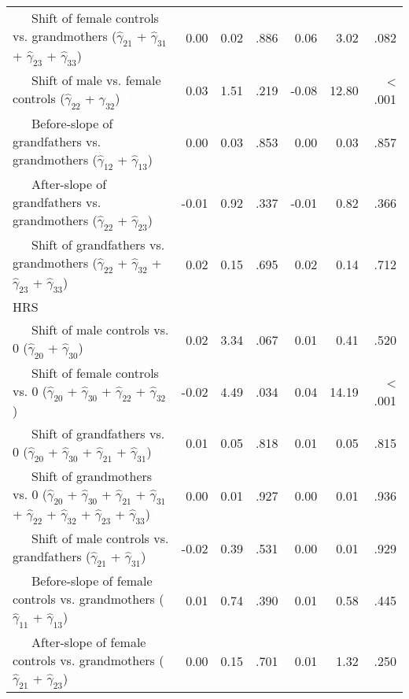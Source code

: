 \documentclass[
  english,
  man, noextraspace]{apa7}
\newenvironment{lltable}{\begin{landscape}\begin{center}\begin{ThreePartTable}}{\end{ThreePartTable}\end{center}\end{landscape}}
\begin{document}
\begin{appendix}
\begin{lltable}
{\begin{longtable}{lrrrrrr}
\ \ \ Shift of female controls vs. grandmothers 
($\hat{\gamma}_{21}$ + $\hat{\gamma}_{31}$ + 
$\hat{\gamma}_{23}$ + $\hat{\gamma}_{33}$) \textcolor{white}{L} & 0.00 & 0.02 & .886 & 0.06 & 3.02 & .082\\
\ \ \ Shift of male vs. female controls 
($\hat{\gamma}_{22}$ + $\hat{\gamma}_{32}$) \textcolor{white}{L} & 0.03 & 1.51 & .219 & -0.08 & 12.80 & < .001\\
\ \ \ Before-slope of grandfathers vs. grandmothers 
($\hat{\gamma}_{12}$ + $\hat{\gamma}_{13}$) \textcolor{white}{L} & 0.00 & 0.03 & .853 & 0.00 & 0.03 & .857\\
\ \ \ After-slope of grandfathers vs. grandmothers 
($\hat{\gamma}_{22}$ + $\hat{\gamma}_{23}$) \textcolor{white}{L} & -0.01 & 0.92 & .337 & -0.01 & 0.82 & .366\\
\ \ \ Shift of grandfathers vs. grandmothers 
($\hat{\gamma}_{22}$ + $\hat{\gamma}_{32}$ + 
$\hat{\gamma}_{23}$ + $\hat{\gamma}_{33}$) \textcolor{white}{L} & 0.02 & 0.15 & .695 & 0.02 & 0.14 & .712\\
HRS &  &  &  &  &  & \\
\ \ \ Shift of male controls vs. 0 ($\hat{\gamma}_{20}$ + 
$\hat{\gamma}_{30}$) \textcolor{white}{H} & 0.02 & 3.34 & .067 & 0.01 & 0.41 & .520\\
\ \ \ Shift of female controls vs. 0 ($\hat{\gamma}_{20}$ + 
$\hat{\gamma}_{30}$ + $\hat{\gamma}_{22}$ + 
$\hat{\gamma}_{32}$) \textcolor{white}{H} & -0.02 & 4.49 & .034 & 0.04 & 14.19 & < .001\\
\ \ \ Shift of grandfathers vs. 0 ($\hat{\gamma}_{20}$ + 
$\hat{\gamma}_{30}$ + $\hat{\gamma}_{21}$ + 
$\hat{\gamma}_{31}$) \textcolor{white}{H} & 0.01 & 0.05 & .818 & 0.01 & 0.05 & .815\\
\ \ \ Shift of grandmothers vs. 0 ($\hat{\gamma}_{20}$ + 
$\hat{\gamma}_{30}$ + $\hat{\gamma}_{21}$ + 
$\hat{\gamma}_{31}$ + $\hat{\gamma}_{22}$ + 
$\hat{\gamma}_{32}$ + $\hat{\gamma}_{23}$ +
$\hat{\gamma}_{33}$) \textcolor{white}{H} & 0.00 & 0.01 & .927 & 0.00 & 0.01 & .936\\
\ \ \ Shift of male controls vs. grandfathers 
($\hat{\gamma}_{21}$ + $\hat{\gamma}_{31}$) \textcolor{white}{H} & -0.02 & 0.39 & .531 & 0.00 & 0.01 & .929\\
\ \ \ Before-slope of female controls vs. grandmothers 
($\hat{\gamma}_{11}$ + $\hat{\gamma}_{13}$) \textcolor{white}{H} & 0.01 & 0.74 & .390 & 0.01 & 0.58 & .445\\
\ \ \ After-slope of female controls vs. grandmothers 
($\hat{\gamma}_{21}$ + $\hat{\gamma}_{23}$) \textcolor{white}{H} & 0.00 & 0.15 & .701 & 0.01 & 1.32 & .250\\

\end{longtable}}
\end{lltable}
\end{appendix}
\end{document}
